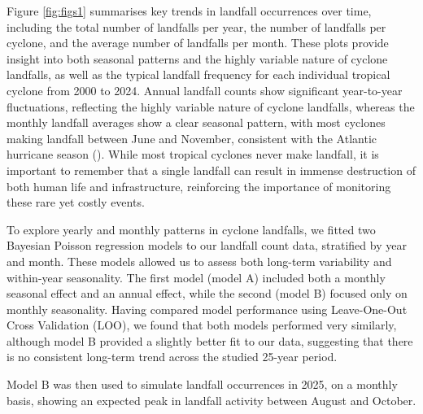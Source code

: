 \documentclass[
]{article}
\begin{document}
Figure \ref{fig:figs1} summarises key trends in landfall occurrences over time, including the total number of landfalls per year, the number of landfalls per cyclone, and the average number of landfalls per month. These plots provide insight into both seasonal patterns and the highly variable nature of cyclone landfalls, as well as the typical landfall frequency for each individual tropical cyclone from 2000 to 2024. Annual landfall counts show significant year-to-year fluctuations, reflecting the highly variable nature of cyclone landfalls, whereas the monthly landfall averages show a clear seasonal pattern, with most cyclones making landfall between June and November, consistent with the Atlantic hurricane season (). While most tropical cyclones never make landfall, it is important to remember that a single landfall can result in immense destruction of both human life and infrastructure, reinforcing the importance of monitoring these rare yet costly events.

To explore yearly and monthly patterns in cyclone landfalls, we fitted two Bayesian Poisson regression models to our landfall count data, stratified by year and month. These models allowed us to assess both long-term variability and within-year seasonality. The first model (model A) included both a monthly seasonal effect and an annual effect, while the second (model B) focused only on monthly seasonality. Having compared model performance using Leave-One-Out Cross Validation (LOO), we found that both models performed very similarly, although model B provided a slightly better fit to our data, suggesting that there is no consistent long-term trend across the studied 25-year period.

Model B was then used to simulate landfall occurrences in 2025, on a monthly basis, showing an expected peak in landfall activity between August and October.
\end{document}
